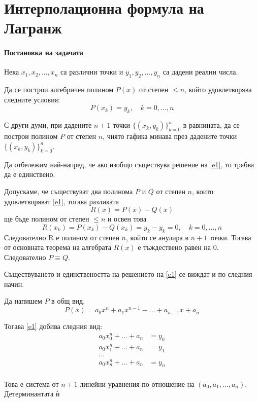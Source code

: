 \documentclass[12pt]{article}
\numberwithin{equation}{section}
\numberwithin{theorem}{section}
\numberwithin{definition}{section}
\numberwithin{corollary}{section}
\begin{document}
\section{Интерполационна формула на Лагранж}
\paragraph{Постановка на задачата\\}
Нека $x_1,x_2,...,x_n$ са различни точки и $y_1,y_2,...,y_n$ са дадени
реални числа.
\par
Да се построи алгебричен полином $P(x)$ от степен $\leq n$, който удовлетворява следните условия:\\
\begin{equation} \label{e1}
        P(x_k) = y_k,\hspace{12pt} k=0,\dotso,n 
\end{equation}
\par
С други думи, при дадените $n+1$ точки $\{(x_k,y_k)\}_{k=0}^n$ в равнината, да се построи полином $P$ от степен $n$, чиято гафика минава през дадените точки $\{(x_k,y_k)\}_{k=0}^n$.
\par
Да отбележим най-напред, че ако изобщо съществува решение на \ref{e1}, то трябва да е единствено.
\par
Допускаме, че съществуват два полинома $P$ и $Q$ от степен $n$, които удовлетворяват \ref{e1}, тогава разликата
\[
R(x) = P(x) - Q(x)
\]
ще бъде полином от степен $\leq n$ и освен това 
\[
R(x_k) = P(x_k) - Q(x_k) = y_k - y_k = 0,\hspace{12pt}k=0,\dotso,n
\]
Следователно R е полином от степен $n$, който се анулира в $n+1$ точки. Тогава от основната теорема на алгебрата $R(x)$ е тъждествено равен на 0. Следователно $P\equiv Q$.
\par
Съществуването и единствеността на решението на \ref{e1} се виждат и по следния начин.
\par
Да напишем $P$ в общ вид.
\[
P(x) = a_0x^n + a_1x^{n-1} + \dotso + a_{n-1}x + a_n
\]
\par
Тогава \ref{e1} добива следния вид:
\begin{align*}
a_0x_0^n + \dotso + a_n &= y_0\\
a_0x_1^n + \dotso + a_n &= y_1\\
\dotso\\
a_0x_n^n + \dotso + a_n &= y_n\\
\end{align*}
\par
Това е система от $n+1$ линейни уравнения по отношение на $(a_0,a_1,\dotso,a_n)$. Детерминантата ѝ
\end{document}
